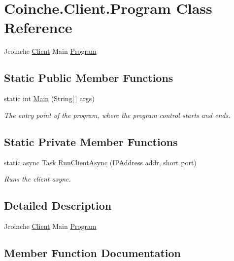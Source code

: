 \hypertarget{class_coinche_1_1_client_1_1_program}{}\section{Coinche.\+Client.\+Program Class Reference}
\label{class_coinche_1_1_client_1_1_program}


Jcoinche \hyperlink{namespace_coinche_1_1_client}{Client} Main \hyperlink{class_coinche_1_1_client_1_1_program}{Program}  


\subsection*{Static Public Member Functions}
\begin{DoxyCompactItemize}
\item 
static int \hyperlink{class_coinche_1_1_client_1_1_program_a4017f65cee201ce2c210a4abc290c663}{Main} (String\mbox{[}$\,$\mbox{]} args)
\begin{DoxyCompactList}\small\item\em The entry point of the program, where the program control starts and ends. \end{DoxyCompactList}\end{DoxyCompactItemize}
\subsection*{Static Private Member Functions}
\begin{DoxyCompactItemize}
\item 
static async Task \hyperlink{class_coinche_1_1_client_1_1_program_a748963e969bfd9e466f58422f39bc1b8}{Run\+Client\+Async} (I\+P\+Address addr, short port)
\begin{DoxyCompactList}\small\item\em Runs the client async. \end{DoxyCompactList}\end{DoxyCompactItemize}


\subsection{Detailed Description}
Jcoinche \hyperlink{namespace_coinche_1_1_client}{Client} Main \hyperlink{class_coinche_1_1_client_1_1_program}{Program} 



\subsection{Member Function Documentation}
\mbox{\label{class_coinche_1_1_client_1_1_program_a4017f65cee201ce2c210a4abc290c663}} 
